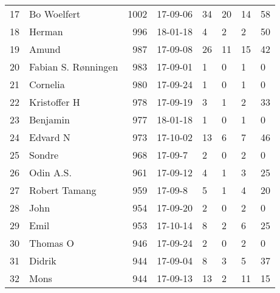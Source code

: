 \begin{longtable}{|r|l|r|l|l|l|l|l|}
17 &          Bo Woelfert &  1002 &    17-09-06 &              34 &    20 &      14 &        58 \\
18 &               Herman &   996 &    18-01-18 &               4 &     2 &       2 &        50 \\
19 &                Amund &   987 &    17-09-08 &              26 &    11 &      15 &        42 \\
20 &  Fabian S. Rønningen &   983 &    17-09-01 &               1 &     0 &       1 &         0 \\
21 &             Cornelia &   980 &    17-09-24 &               1 &     0 &       1 &         0 \\
22 &         Kristoffer H &   978 &    17-09-19 &               3 &     1 &       2 &        33 \\
23 &             Benjamin &   977 &    18-01-18 &               1 &     0 &       1 &         0 \\
24 &             Edvard N &   973 &    17-10-02 &              13 &     6 &       7 &        46 \\
25 &               Sondre &   968 &     17-09-7 &               2 &     0 &       2 &         0 \\
26 &            Odin A.S. &   961 &    17-09-12 &               4 &     1 &       3 &        25 \\
27 &        Robert Tamang &   959 &     17-09-8 &               5 &     1 &       4 &        20 \\
28 &                 John &   954 &    17-09-20 &               2 &     0 &       2 &         0 \\
29 &                 Emil &   953 &    17-10-14 &               8 &     2 &       6 &        25 \\
30 &             Thomas O &   946 &    17-09-24 &               2 &     0 &       2 &         0 \\
31 &               Didrik &   944 &    17-09-04 &               8 &     3 &       5 &        37 \\
32 &                 Mons &   944 &    17-09-13 &              13 &     2 &      11 &        15 \\
\end{longtable}
